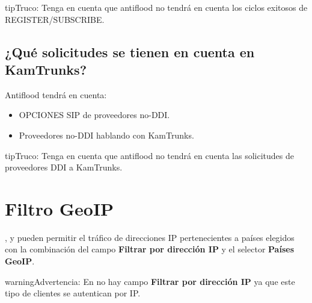 \documentclass[letterpaper,10pt,spanish]{sphinxmanual}
\begin{document}
\begin{notice}{tip}{Truco:}
Tenga en cuenta que antiflood no tendrá en cuenta los ciclos exitosos de REGISTER/SUBSCRIBE.
\end{notice}


\subsection{¿Qué solicitudes se tienen en cuenta en KamTrunks?}
\label{security_and_maintenance/security/antiflooding:which-requests-are-taken-into-account-in-kamtrunks}
Antiflood tendrá en cuenta:
\begin{itemize}
\item {} 
OPCIONES SIP de proveedores no-DDI.

\item {} 
Proveedores no-DDI hablando con KamTrunks.

\end{itemize}

\begin{notice}{tip}{Truco:}
Tenga en cuenta que antiflood no tendrá en cuenta las solicitudes de proveedores DDI a KamTrunks.
\end{notice}


\section{Filtro GeoIP}
\label{security_and_maintenance/security/geoip_filter:geoip-filter}\label{security_and_maintenance/security/geoip_filter::doc}\label{security_and_maintenance/security/geoip_filter:id1}
{\hyperref[administration_portal/client/vpbx/index:vpbx\string-clients]{}}, {\hyperref[administration_portal/client/retail/index:retail\string-clients]{}} y {\hyperref[administration_portal/client/residential/index:residential\string-clients]{}} pueden permitir el tráfico de direcciones IP pertenecientes a países elegidos con la combinación del campo \textbf{Filtrar por dirección IP} y el selector \textbf{Países GeoIP}.

\begin{notice}{warning}{Advertencia:}
En {\hyperref[administration_portal/client/wholesale/index:wholesale\string-clients]{}} no hay campo \textbf{Filtrar por dirección IP} ya que este tipo de clientes se autentican por IP.
\end{notice}
\end{document}
